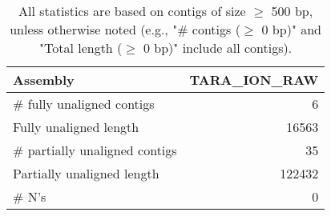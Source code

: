 \documentclass[12pt,a4paper]{article}
\begin{document}
\begin{table}[ht]
\begin{center}
\caption{All statistics are based on contigs of size $\geq$ 500 bp, unless otherwise noted (e.g., "\# contigs ($\geq$ 0 bp)" and "Total length ($\geq$ 0 bp)" include all contigs).}
\begin{tabular}{|l*{1}{|r}|}
\hline
Assembly & TARA\_ION\_RAW \\ \hline
\# fully unaligned contigs & 6 \\ \hline
Fully unaligned length & 16563 \\ \hline
\# partially unaligned contigs & 35 \\ \hline
Partially unaligned length & 122432 \\ \hline
\# N's & 0 \\ \hline
\end{tabular}
\end{center}
\end{table}
\end{document}
